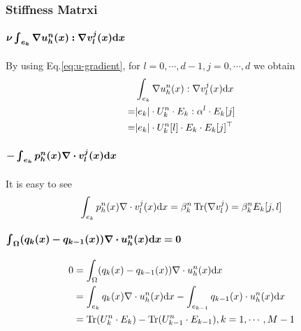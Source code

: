 \subsubsection{Stiffness Matrxi}
\paragraph{$\bm{\nu\int_{e_k}\nabla u_h^n(x):\nabla v^j_l(x)\mathrm{d} x}$} 
By using Eq.\eqref{eq:u-gradient}, for $l=0,\cdots,d-1,j=0,\cdots,d$ we obtain
\begin{equation}
  \begin{split}
    &\int_{e_k}\nabla u_h^n(x):\nabla v^j_l(x)\mathrm{d} x \\
    =& |e_k|\cdot U_k^n\cdot E_k:\alpha^l\cdot E_k[j] \\
    =& |e_k|\cdot U_k^n[l]\cdot E_k\cdot E_k[j]^\top
  \end{split}
\end{equation}

\paragraph{$\bm{-\int_{e_k}p_h^n(x)\nabla\cdot v^j_l(x)\mathrm{d} x}$}
It is easy to see
\begin{equation}
  \int_{e_k}p_h^n(x)\nabla\cdot v^j_l(x)\mathrm{d} x=\beta_k^n\operatorname*{Tr}(\nabla v^j_l)=\beta_k^nE_k[j,l] 
\end{equation}
\paragraph{$\bm{\int_{\Omega}(q_k(x)-q_{k-1}(x))\nabla\cdot u_h^n(x)\mathrm{d} x=0}$}
\begin{equation}
  \begin{split}
    0&=\int_{\Omega}(q_k(x)-q_{k-1}(x))\nabla\cdot u_h^n(x)\mathrm{d} x \\
    &=\int_{e_k}q_k(x)\nabla\cdot u_h^n(x)\mathrm{d} x-\int_{e_{k-1}}q_{k-1}(x)\cdot u_h^n(x)\mathrm{d} x \\
    &=\operatorname*{Tr}(U_k^n\cdot E_k)-\operatorname*{Tr}(U_{k-1}^n\cdot E_{k-1}),k=1,\cdots,M-1
  \end{split}
\end{equation}

